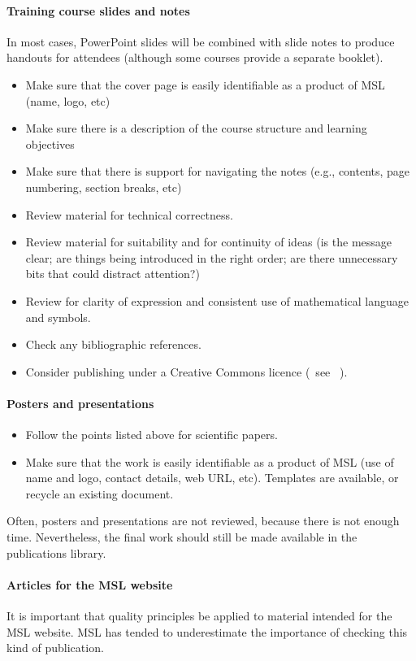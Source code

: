 \paragraph{Training course slides and notes}
In most cases, PowerPoint slides will be combined with slide notes to produce handouts for attendees (although some courses provide a separate booklet). 
\begin{itemize}
\item  Make sure that the cover page is easily identifiable as a product of MSL (name, logo, etc)
\item  Make sure there is a description of the course structure and learning objectives
\item  Make sure that there is support for navigating the notes (e.g., contents, page numbering, section breaks, etc) 
\item  Review material for technical correctness.
\item  Review material for suitability and for continuity of ideas (is the message clear; are things being introduced in the right order; are there unnecessary bits that could distract attention?)
\item  Review for clarity of expression and consistent use of mathematical language and symbols.  
\item  Check any bibliographic references. 
\item  Consider publishing under a Creative Commons licence (~see \cite[\S\ref*{GRP-s_copyright}]{MSL_Reporting_Guidelines}~).
\end{itemize}
\paragraph{Posters and presentations}
\begin{itemize}
\item  Follow the points listed above for scientific papers.
\item  Make sure that the work is easily identifiable as a product of MSL (use of name and logo, contact details, web URL, etc). Templates are available, or recycle an existing document.
\end{itemize} 

Often, posters and presentations are not reviewed, because there is not enough time. Nevertheless, the final work should still be made available in the publications library. 

\paragraph{Articles for the MSL website}
It is important that quality principles be applied to material intended for the MSL website. MSL has tended to underestimate the importance of checking this kind of publication.

